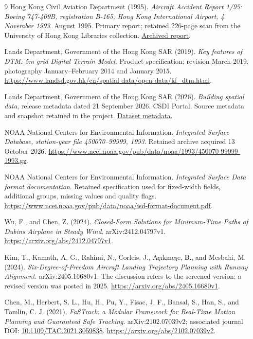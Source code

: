\begin{thebibliography}{9}
 Hong Kong Civil Aviation Department (1995).
\emph{Aircraft Accident Report 1/95: Boeing 747-409B, registration B-165, Hong Kong International Airport, 4 November 1993}. August 1995. Primary report; retained 226-page scan from the University of Hong Kong Libraries collection. \href{https://web.archive.org/web/20180517095657id_/http://ebook.lib.hku.hk/HKG/B35838838.pdf}{Archived report}.

 Lands Department, Government of the Hong Kong SAR (2019).
\emph{Key features of DTM: 5m-grid Digital Terrain Model}. Product specification; revision March 2019, photography January--February 2014 and January 2015. \url{https://www.landsd.gov.hk/en/spatial-data/open-data/kf_dtm.html}.

 Lands Department, Government of the Hong Kong SAR (2026).
\emph{Building spatial data}, release metadata dated 21 September 2026. CSDI Portal. Source metadata and snapshot retained in the project. \href{https://portal.csdi.gov.hk/csdi-webpage/metadata/landsd_rcd_1637211194312_35158/html}{Dataset metadata}.

 NOAA National Centers for Environmental Information.
\emph{Integrated Surface Database, station-year file 450070--99999, 1993}. Retained archive acquired 13 October 2026. \url{https://www.ncei.noaa.gov/pub/data/noaa/1993/450070-99999-1993.gz}.

 NOAA National Centers for Environmental Information.
\emph{Integrated Surface Data format documentation}. Retained specification used for fixed-width fields, additional groups, missing values and quality flags. \url{https://www.ncei.noaa.gov/pub/data/noaa/isd-format-document.pdf}.

 Wu, F., and Chen, Z. (2024).
\emph{Closed-Form Solutions for Minimum-Time Paths of Dubins Airplane in Steady Wind}. arXiv:2412.04797v1. \url{https://arxiv.org/abs/2412.04797v1}.

 Kim, T., Kamath, A. G., Rahimi, N., Corleis, J., Açıkmeşe, B., and Mesbahi, M. (2024).
\emph{Six-Degree-of-Freedom Aircraft Landing Trajectory Planning with Runway Alignment}. arXiv:2405.16680v1. The discussion refers to the screened version; a revised version was posted in 2025. \url{https://arxiv.org/abs/2405.16680v1}.

 Chen, M., Herbert, S. L., Hu, H., Pu, Y., Fisac, J. F., Bansal, S., Han, S., and Tomlin, C. J. (2021).
\emph{FaSTrack: a Modular Framework for Real-Time Motion Planning and Guaranteed Safe Tracking}. arXiv:2102.07039v2; associated journal DOI: \href{https://doi.org/10.1109/TAC.2021.3059838}{10.1109/TAC.2021.3059838}. \url{https://arxiv.org/abs/2102.07039v2}.
\end{thebibliography}
